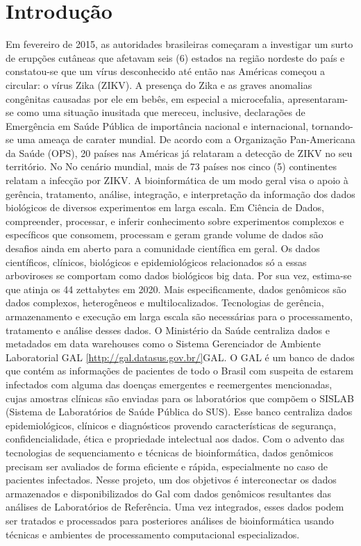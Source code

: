 \chapter{Introdução}

Em fevereiro de 2015, as autoridades brasileiras começaram a investigar um surto de erupções cutâneas que afetavam seis (6) estados na região nordeste do país e constatou-se que um vírus desconhecido até então nas Américas começou a circular: o vírus Zika (ZIKV). A presença do Zika e as graves anomalias congênitas causadas por ele em bebês, em especial a microcefalia, apresentaram-se como uma situação inusitada que mereceu, inclusive, declarações de Emergência em Saúde Pública de importância nacional e internacional, tornando-se uma ameaça de carater mundial.
De acordo com a Organização Pan-Americana da Saúde (OPS), 20 países nas Américas  já relataram a detecção de ZIKV no seu território. No No cenário mundial, mais de 73 países nos cinco (5) continentes relatam a infecção por ZIKV.
A bioinformática de um modo geral visa o apoio à gerência, tratamento, análise, integração, e interpretação da informação dos dados biológicos de diversos experimentos em larga escala. Em Ciência de Dados, compreender, processar, e inferir conhecimento sobre experimentos complexos e específicos que consomem, processam e geram grande volume de dados são desafios ainda em aberto para a comunidade científica em geral. Os dados científicos, clínicos, biológicos e epidemiológicos relacionados só a essas arboviroses se comportam como dados biológicos big data. Por sua vez, estima-se que atinja os 44 zettabytes em 2020. Mais especificamente, dados genômicos são dados complexos, heterogêneos e multilocalizados. Tecnologias de gerência, armazenamento e execução em larga escala são necessárias para o processamento, tratamento e análise desses dados.
O Ministério da Saúde centraliza dados e metadados em data warehouses como o Sistema Gerenciador de Ambiente Laboratorial GAL \ref{http://gal.datasus.gov.br/}{GAL}.
O GAL é um banco de dados que contém as informações de pacientes de todo o Brasil com suspeita de estarem infectados com alguma das doenças emergentes e reemergentes mencionadas, cujas amostras clínicas são enviadas para os laboratórios que compõem o SISLAB (Sistema de Laboratórios de Saúde Pública do SUS). Esse banco centraliza dados epidemiológicos, clínicos e diagnósticos provendo características de segurança, confidencialidade, ética e propriedade intelectual aos dados.
Com o advento das tecnologias de sequenciamento e técnicas de bioinformática, dados genômicos precisam ser avaliados de forma eficiente e rápida, especialmente no caso de pacientes infectados. Nesse projeto, um dos objetivos é interconectar os dados armazenados e disponibilizados do Gal com dados genômicos resultantes das análises de Laboratórios de Referência. Uma vez integrados, esses dados podem ser tratados e processados para posteriores análises de bioinformática usando técnicas e ambientes de processamento computacional especializados.